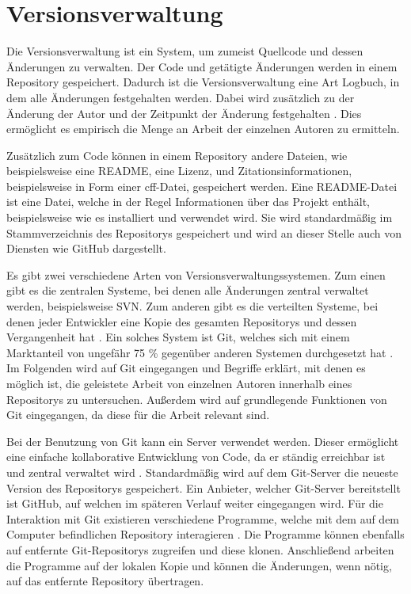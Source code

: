 \section{Versionsverwaltung}
\label{sec:versionsverwaltung}
Die Versionsverwaltung ist ein System, um zumeist Quellcode und dessen Änderungen zu verwalten.
Der Code und getätigte Änderungen werden in einem Repository gespeichert.
Dadurch ist die Versionsverwaltung eine Art Logbuch, in dem alle Änderungen festgehalten werden.
Dabei wird zusätzlich zu der Änderung der Autor und der Zeitpunkt der Änderung festgehalten \autocite{ponuthorai_version_2022}.
Dies ermöglicht es empirisch die Menge an Arbeit der einzelnen Autoren zu ermitteln.

Zusätzlich zum Code können in einem Repository andere Dateien, wie beispielsweise eine README, eine Lizenz, und Zitationsinformationen, beispielsweise in Form einer \gls{cff}-Datei, gespeichert werden.
Eine README-Datei ist eine Datei, welche in der Regel Informationen über das Projekt enthält, beispielsweise wie es installiert und verwendet wird.
Sie wird standardmäßig im Stammverzeichnis des Repositorys gespeichert und wird an dieser Stelle auch von Diensten wie GitHub dargestellt.

Es gibt zwei verschiedene Arten von Versionsverwaltungssystemen.
Zum einen gibt es die zentralen Systeme, bei denen alle Änderungen zentral verwaltet werden, beispielsweise SVN.
Zum anderen gibt es die verteilten Systeme, bei denen jeder Entwickler eine Kopie des gesamten Repositorys und dessen Vergangenheit hat \autocite{ponuthorai_version_2022}.
Ein solches System ist Git, welches sich mit einem Marktanteil von ungefähr 75 \% gegenüber anderen Systemen durchgesetzt hat \autocite{lindner_version_2024}.
Im Folgenden wird auf Git eingegangen und Begriffe erklärt, mit denen es möglich ist, die geleistete Arbeit von einzelnen Autoren innerhalb eines Repositorys zu untersuchen.
Außerdem wird auf grundlegende Funktionen von Git eingegangen, da diese für die Arbeit relevant sind.

Bei der Benutzung von Git kann ein Server verwendet werden.
Dieser ermöglicht eine einfache kollaborative Entwicklung von Code, da er ständig erreichbar ist und zentral verwaltet wird \autocite{ponuthorai_version_2022}.
Standardmäßig wird auf dem Git-Server die neueste Version des Repositorys gespeichert.
Ein Anbieter, welcher Git-Server bereitstellt ist GitHub, auf welchen im späteren Verlauf weiter eingegangen wird.
Für die Interaktion mit Git existieren verschiedene Programme, welche mit dem auf dem Computer befindlichen Repository interagieren \autocite{ponuthorai_version_2022}.
Die Programme können ebenfalls auf entfernte Git-Repositorys zugreifen und diese klonen.
Anschließend arbeiten die Programme auf der lokalen Kopie und können die Änderungen, wenn nötig, auf das entfernte Repository übertragen.


